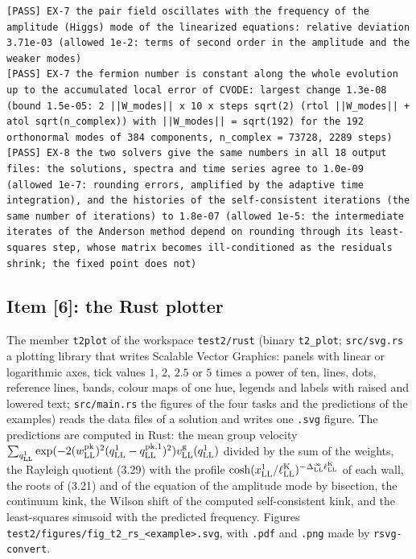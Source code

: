 \documentclass[
  10pt,
]{article}
\begin{document}
\begin{verbatim}
[PASS] EX-7 the pair field oscillates with the frequency of the amplitude (Higgs) mode of the linearized equations: relative deviation 3.71e-03 (allowed 1e-2: terms of second order in the amplitude and the weaker modes)
[PASS] EX-7 the fermion number is constant along the whole evolution up to the accumulated local error of CVODE: largest change 1.3e-08 (bound 1.5e-05: 2 ||W_modes|| x 10 x steps sqrt(2) (rtol ||W_modes|| + atol sqrt(n_complex)) with ||W_modes|| = sqrt(192) for the 192 orthonormal modes of 384 components, n_complex = 73728, 2289 steps)
[PASS] EX-8 the two solvers give the same numbers in all 18 output files: the solutions, spectra and time series agree to 1.0e-09 (allowed 1e-7: rounding errors, amplified by the adaptive time integration), and the histories of the self-consistent iterations (the same number of iterations) to 1.8e-07 (allowed 1e-5: the intermediate iterates of the Anderson method depend on rounding through its least-squares step, whose matrix becomes ill-conditioned as the residuals shrink; the fixed point does not)
\end{verbatim}

\hypertarget{item-6-the-rust-plotter}{%
\subsection{Item {[}6{]}: the Rust
plotter}\label{item-6-the-rust-plotter}}

The member \texttt{t2plot} of the workspace \texttt{test2/rust} (binary
\texttt{t2\_plot}; \texttt{src/svg.rs} a plotting library that writes
Scalable Vector Graphics: panels with linear or logarithmic axes, tick
values \(1\), \(2\), \(2.5\) or \(5\) times a power of ten, lines, dots,
reference lines, bands, colour maps of one hue, legends and labels with
raised and lowered text; \texttt{src/main.rs} the figures of the four
tasks and the predictions of the examples) reads the data files of a
solution and writes one \texttt{.svg} figure. The predictions are
computed in Rust: the mean group velocity
\(\sum_{q^1_{\rm LL}}\exp(-2(w^{\rm pk}_{\rm LL})^2(q^1_{\rm LL}-q^{{\rm pk},1}_{\rm LL})^2)v^{\rm g}_{\rm LL}(q^1_{\rm LL})\)
divided by the sum of the weights, the Rayleigh quotient (3.29) with the
profile
\(\cosh(x^1_{\rm LL}/\ell^{\rm K}_{\rm LL})^{-\Delta^\infty_{\rm LL}\ell^{\rm K}_{\rm LL}}\)
of each wall, the roots of (3.21) and of the equation of the amplitude
mode by bisection, the continuum kink, the Wilson shift of the computed
self-consistent kink, and the least-squares sinusoid with the predicted
frequency. Figures
\texttt{test2/figures/fig\_t2\_rs\_\textless{}example\textgreater{}.svg},
with \texttt{.pdf} and \texttt{.png} made by \texttt{rsvg-convert}.
\end{document}
